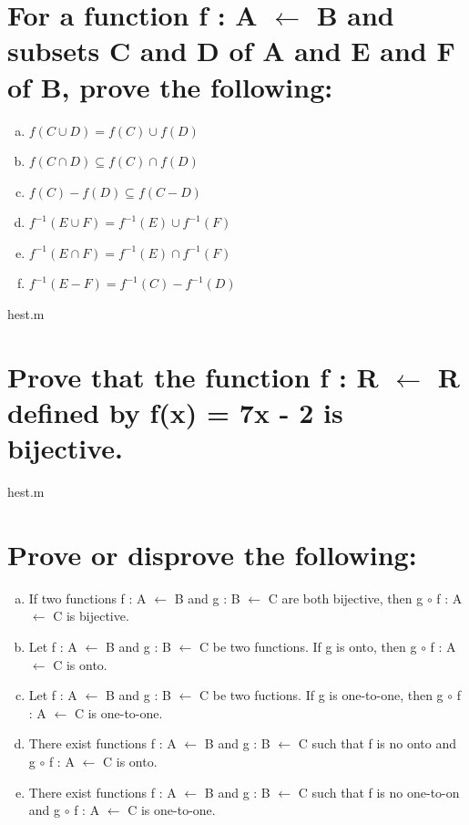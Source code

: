 \section{For a function f : A $\leftarrow$ B and subsets C and D of A and E and F of B, prove the following:}
\begin{enumerate}[a.]
\item $f(C \cup D) = f(C) \cup f(D)$
\item $f(C \cap D) \subseteq f(C) \cap f(D)$
\item $f(C) - f(D) \subseteq f(C-D)$
\item $f^{-1}(E \cup F) = f^{-1}(E) \cup f^{-1}(F)$
\item $f^{-1}(E \cap F) = f^{-1}(E) \cap f^{-1}(F)$
\item $f^{-1}(E - F) = f^{-1}(C) - f^{-1}(D)$
\end{enumerate}
hest.m

\section{Prove that the function f : R $\leftarrow$ R defined by f(x) = 7x - 2 is bijective.}
hest.m

\section{Prove or disprove the following:}
\begin{enumerate}[a.]
\item If two functions f : A $\leftarrow$ B and g : B $\leftarrow$ C are both bijective, then g $\circ$ f : A $\leftarrow$ C is bijective.
\item Let f : A $\leftarrow$ B and g : B $\leftarrow$ C be two functions. If g is onto, then g $\circ$ f : A $\leftarrow$ C is onto.
\item Let f : A $\leftarrow$ B and g : B $\leftarrow$ C be two fuctions. If g is one-to-one, then g $\circ$ f : A $\leftarrow$ C is one-to-one.
\item There exist functions f : A $\leftarrow$ B and g : B $\leftarrow$ C such that f is no onto and g $\circ$ f : A $\leftarrow$ C is onto.
\item There exist functions f : A $\leftarrow$ B and g : B $\leftarrow$ C such that f is no one-to-on and g $\circ$ f : A $\leftarrow$ C is one-to-one.
\end{enumerate}